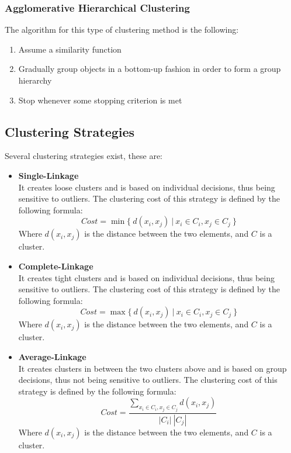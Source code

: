 \documentclass{article}
\begin{document}
\subsubsection{Agglomerative Hierarchical Clustering}
The algorithm for this type of clustering method is the following:

\begin{enumerate}
	\item Assume a similarity function
	\item Gradually group objects in a bottom-up fashion in order to form a group hierarchy
	\item Stop whenever some stopping criterion is met
\end{enumerate}

\subsection{Clustering Strategies}
Several clustering strategies exist, these are:

\begin{itemize}
	\item \textbf{Single-Linkage}
	\vspace{.2cm} \\
	It creates loose clusters and is based on individual decisions, thus being sensitive to outliers. The clustering cost of this strategy is defined by the following formula:
	\[ Cost = \min\{~d(x_i, x_j)~|~x_i \in C_i, x_j \in C_j~\} \]
	Where $d(x_i, x_j)$ is the distance between the two elements, and $C$ is a cluster.
	
	\item \textbf{Complete-Linkage}
	\vspace{.2cm} \\
	It creates tight clusters and is based on individual decisions, thus being sensitive to outliers. The clustering cost of this strategy is defined by the following formula:
	\[ Cost = \max\{~d(x_i, x_j)~|~x_i \in C_i, x_j \in C_j~\} \]
	Where $d(x_i, x_j)$ is the distance between the two elements, and $C$ is a cluster.
	
	\item \textbf{Average-Linkage}
	\vspace{.2cm} \\
	It creates clusters in between the two clusters above and is based on group decisions, thus not being sensitive to outliers. The clustering cost of this strategy is defined by the following formula:
	\[ Cost = \frac{\sum_{x_i \in C_i, x_j \in C_j} d(x_i, x_j)}{|C_i| ~ |C_j|} \]
	Where $d(x_i, x_j)$ is the distance between the two elements, and $C$ is a cluster.
\end{itemize}
\end{document}
